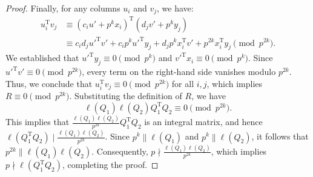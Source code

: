 \documentclass[10pt,a4paper]{amsart}
\newcommand{\trans}{^{\mathrm{T}}}
\begin{document}
\begin{proof}
Finally, for any columns $u_i$ and $v_j$, we have:
\begin{align*}
u_i\trans v_j &\equiv (c_i u' + p^{k} x_i)\trans (d_j v' + p^{k} y_j) \\
&\equiv c_i d_j {u'}\trans v' + c_i p^{k} {u'}\trans y_j + d_j p^{k} x_i\trans v' + p^{2k} x_i\trans y_j \pmod{p^{2k}}.
\end{align*}
We established that ${u'}\trans y_j \equiv 0 \pmod{p^{k}}$ and ${v'}\trans x_i \equiv 0 \pmod{p^{k}}$. Since ${u'}\trans v' \equiv 0 \pmod{p^{2k}}$, every term on the right-hand side vanishes modulo $p^{2k}$. Thus, we conclude that $u_i\trans v_j \equiv 0 \pmod{p^{2k}}$ for all $i, j$, which implies $R \equiv 0 \pmod{p^{2k}}$. Substituting the definition of $R$, we have
$$\ell(Q_1)\ell(Q_2) Q_1\trans Q_2 \equiv 0 \pmod{p^{2k}}.$$
This implies that  $\frac{\ell(Q_1)\ell(Q_2)}{p^{2k}} Q_1\trans Q_2$ is an integral matrix, and hence $\ell(Q_1\trans Q_2) \mid \frac{\ell(Q_1)\ell(Q_2)}{p^{2k}}$. Since $p^k \parallel \ell(Q_1)$ and $p^k \parallel \ell(Q_2)$, it follows that $p^{2k} \parallel \ell(Q_1)\ell(Q_2)$. Consequently, $p \nmid \frac{\ell(Q_1)\ell(Q_2)}{p^{2k}}$, which implies $p \nmid \ell(Q_1\trans Q_2)$, completing the proof.

\end{proof}
\end{document}
